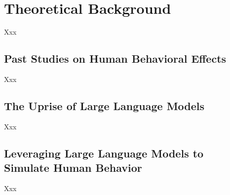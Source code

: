\section{Theoretical Background}
Xxx

\subsection{Past Studies on Human Behavioral Effects}
Xxx

\subsection{The Uprise of Large Language Models}
Xxx

\subsection{Leveraging Large Language Models to Simulate Human Behavior}
Xxx